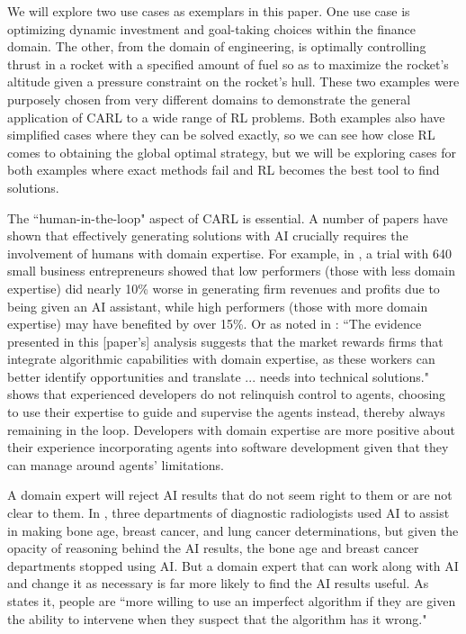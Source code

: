 \documentclass[mnsc,sglanonrev]{informs4}
\begin{document}
We will explore two use cases as exemplars in this paper. One use case is optimizing dynamic investment and goal-taking choices within the finance domain. The other, from the domain of engineering, is optimally controlling thrust in a rocket with a specified amount of fuel so as to maximize the rocket's altitude given a pressure constraint on the rocket's hull. These two examples were purposely chosen from very different domains to demonstrate the general application of CARL to a wide range of RL problems. Both examples also have simplified cases where they can be solved exactly, so we can see how close RL comes to obtaining the global optimal strategy, but we will be exploring cases for both examples where exact methods fail and RL becomes the best tool to find solutions.  

The ``human-in-the-loop" aspect of CARL is essential. A number of papers have shown that effectively generating solutions with AI crucially requires the involvement of humans with domain expertise. For example, in \cite{otis_uneven_2024}, a trial with 640 small business entrepreneurs showed that low performers (those with less domain expertise) did
nearly 10\% worse in generating firm revenues and profits due to being given an AI assistant, while high performers (those with more domain expertise) may have benefited
by over 15\%. Or as noted in \cite{tambe_reskilling_2026}: ``The evidence presented in this [paper's] analysis suggests that the market rewards firms that integrate algorithmic capabilities with domain expertise, as these workers can better identify opportunities and translate
... needs into technical solutions." \cite{huang_professional_2026} shows that experienced developers do not relinquish control to agents, choosing to use their expertise to guide and supervise the agents instead, thereby always remaining in the loop. Developers with domain expertise are more positive about their experience incorporating agents into software development given that they can manage around  agents' limitations. 

A domain expert will reject AI results that do not seem right to them or are not clear to them. In \cite{lebovitz_engage_2022}, three departments of diagnostic radiologists used AI to assist in making bone age, breast cancer, and lung cancer determinations, but given the opacity of reasoning behind the AI results, the bone age and breast cancer departments stopped using AI. But a domain expert that can work along with AI and change it as necessary is far more likely to find the AI results useful.  As \cite{dietvorst_overcoming_2018} states it, people are ``more willing to use an imperfect algorithm if they are given the ability to intervene when they suspect that the algorithm has it wrong." 
\end{document}
